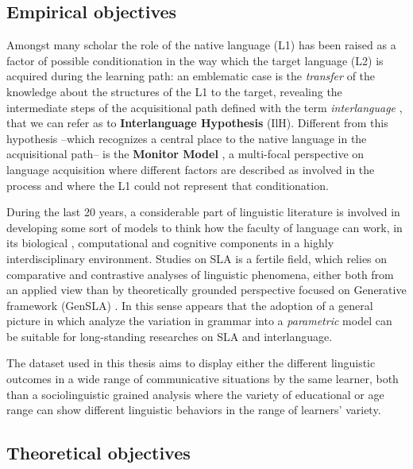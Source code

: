 \documentclass[a4paper,twoside,12pt,chapterprefix=false,bibliography=totocnumbered,listof=flat]{scrbook}
\theoremstyle{definition}
\theoremstyle{definition}
\theoremstyle{definition}
\theoremstyle{remark}
\begin{document}
\subsection{Empirical objectives}\label{empirical-objectives}

Amongst many scholar the role of the native language (L1) has been
raised as a factor of possible conditionation in the way which the
target language (L2) is acquired during the learning path: an emblematic
case is the \emph{transfer} of the knowledge about the structures of the
L1 to the target, revealing the intermediate steps of the acquisitional
path defined with the term \emph{interlanguage} \citep{selinker1972},
that we can refer as to \textbf{Interlanguage Hypothesis} (IlH).
Different from this hypothesis --which recognizes a central place to the
native language in the acquisitional path-- is the \textbf{Monitor
Model} \citep{krashen1981}, a multi-focal perspective on language
acquisition where different factors are described as involved in the
process and where the L1 could not represent that conditionation.

During the last 20 years, a considerable part of linguistic literature
is involved in developing some sort of models to think how the faculty
of language can work, in its biological \citep{hcf2002}, computational
\citep{fodor2001} and cognitive components in a highly interdisciplinary
environment. Studies on SLA is a fertile field, which relies on
comparative and contrastive analyses of linguistic phenomena, either
both from an applied view \citep{ellis1994} than by theoretically
grounded perspective focused on Generative framework (GenSLA)
\citep{guasti2002, hawkins2001, rothmanslabakova2017, sorace2011}. In
this sense appears that the adoption of a general picture in which
analyze the variation in grammar into a \emph{parametric} model
\citep{chomsky1995} can be suitable for long-standing researches on SLA
and interlanguage.

The dataset used in this thesis aims to display either the different
linguistic outcomes in a wide range of communicative situations by the
same learner, both than a sociolinguistic grained analysis where the
variety of educational or age range can show different linguistic
behaviors in the range of learners' variety.

\subsection{Theoretical objectives}\label{theoretical-objectives}
\end{document}
